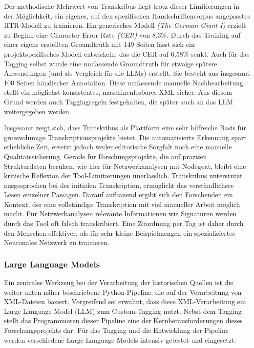 \documentclass[12pt, a4paper, ngerman, bidi=default]{article}
\begin{document}
Der methodische Mehrwert von Transkribus liegt trotz dieser Limitierungen in der Möglichkeit, ein eigenes, auf den spezifischen Handschriftencorpus 
angepasstes HTR-Modell zu trainieren. Ein generisches Modell \textit{(The German Giant I)} erzielt zu Beginn eine Character Error Rate \textit{(CER)} von 8,3\%. 
Durch das Training auf einer eigens erstellten Groundtruth mit 149 Seiten lässt sich ein projektspezifisches Modell entwickeln, das die CER auf 6,58\% senkt. 
Auch für das Tagging selbst wurde eine umfassende Groundtruth für etwaige spätere Anwendungen (und als Vergleich für die LLMs) erstellt. Sie besteht aus insgesamt
 100 Seiten händischer Annotation. Diese umfassende manuelle Nachbearbeitung stellt ein möglichst konsistentes, maschinenlesbares XML sicher. Aus diesem Grund 
 werden auch Taggingregeln festgehalten, die später auch an das LLM weitergegeben werden.

Insgesamt zeigt sich, dass Transkribus als Plattform eine sehr hilfreiche Basis für grossvolumige Transkriptionsprojekte bietet. Die automatisierte Erkennung spart erhebliche Zeit,
ersetzt jedoch weder editorische Sorgfalt noch eine manuelle Qualitätssicherung. Gerade für Forschungsprojekte, die auf präzisen Strukturdaten beruhen, wie hier für Netzwerkanalysen
mit Nodegoat, bleibt eine kritische Reflexion der Tool-Limitierungen unerlässlich. Transkribus unterstützt ausgesprochen bei der initialen Transkription, ermöglicht das verständlichere 
Lesen einzelner Passagen. Darauf aufbauend ergibt sich den Forschenden ein Kontext, der eine vollständige Transkription mit viel manueller Arbeit möglich macht. Für Netzwerkanalysen 
relevante Informationen wie Signaturen werden durch das Tool oft falsch transkribiert. Eine Zuordnung per Tag ist daher durch den Menschen effektiver, als für sehr kleine Beispielmengen ein 
spezialisiertes Neuronales Netzwerk zu trainieren.


\subsubsection{Large Language Models}  
Ein zentrales Werkzeug bei der Verarbeitung der historischen Quellen ist die weiter unten näher beschriebene Python-Pipeline, die auf der Verarbeitung von XML-Dateien basiert. Vorgreifend sei erwähnt, dass diese XML-Verarbeitung ein Large Language Model (LLM) zum Custom-Tagging nutzt. Nebst dem Tagging stellt das Programmieren dieser Pipeline eine der Kernherausforderungen dieses Forschungsprojekts dar. 
Für das Tagging und die Entwicklung der Pipeline werden verschiedene Large Language Models intensiv getestet und eingesetzt.
\end{document}
